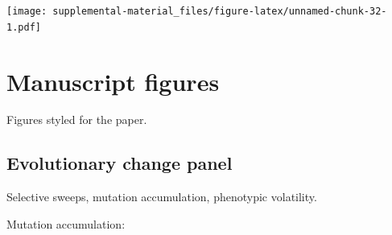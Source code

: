 \documentclass[]{book}
\begin{document}
\texttt{[image: supplemental-material\_files/figure-latex/unnamed-chunk-32-1.pdf]}

\hypertarget{manuscript-figures}{%
\section{Manuscript figures}\label{manuscript-figures}}

Figures styled for the paper.

\hypertarget{evolutionary-change-panel}{%
\subsection{Evolutionary change panel}\label{evolutionary-change-panel}}

Selective sweeps, mutation accumulation, phenotypic volatility.

Mutation accumulation:
\end{document}
